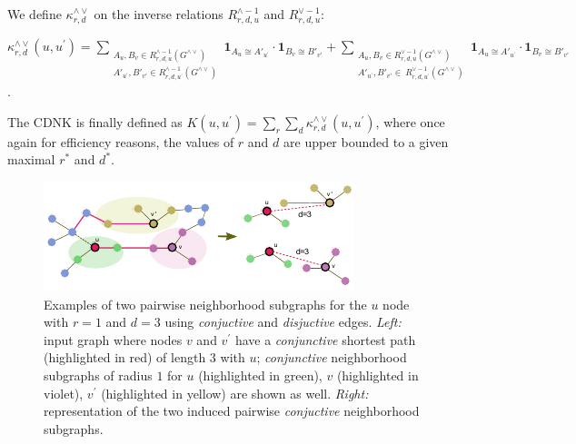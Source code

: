 \documentclass[review]{elsarticle}
\begin{document}
We define $\kappa^{\wedge\vee}_{r,d}$ on the  inverse relations ${R^{\wedge -1}_{r,d,u}}$ and ${R^{\vee -1}_{r,d,u}}$:
\begin{center}
 $\kappa^{\wedge\vee}_{r,d}(u,u^\prime) = \!\!\!\!\!\!\!\!\!\!\!\!
 \sum\limits_{\substack {A_u,{B}_{v} \in {R_{r,d,u}^{\wedge -1}}(G^{\wedge\vee}) \\ A'_{u^\prime},{B'}_{v'} \in {R_{r,d,u^\prime}^{\wedge -1}}(G^{\wedge\vee}) }} \!\!\!\!\!\!\!\!\!\!\!\!
  { \textbf{1}_{A_u \cong A'_{u^\prime}} \cdot { \textbf{1}_{B_{v} \cong B'_{v'}}}}
+ \!\!\!\!\!\!\!\!\!\!\!\!
 \sum\limits_{\substack {A_u,{B}_{v} \in {R_{r,d,u}^{\vee -1}}(G^{\wedge\vee}) \\
  A'_{u^\prime},{B'}_{v'} \in \ {R_{r,d,u^\prime}^{\vee -1}}(G^{\wedge\vee}) }} \!\!\!\!\!\!\!\!\!\!\!\!
  { \textbf{1}_{A_u \cong A'_{u^\prime}} \cdot { \textbf{1}_{B_{v} \cong B'_{v'}}}}
  $.
\end{center}
The CDNK is finally defined as $K(u,u^\prime) = \sum\limits_{r}{\sum\limits_{d}{\kappa^{\wedge\vee}_{r,d}(u,u^\prime)}}$, where once again for efficiency reasons, the values of $r$ and $d$ are upper bounded to a given maximal $r^*$ and $d^*$.

\begin{figure}
\centering
\includegraphics[width=.9\textwidth]{cdnk}
\caption{\label{fig:cdnk} Examples of two pairwise neighborhood subgraphs for the $u$ node with $r=1$ and $d=3$ using \textit{conjuctive} and \textit{disjuctive} edges. {\it Left:} input graph where nodes $v$ and $v^\prime$ have a {\it conjunctive} shortest path (highlighted in red) of length $3$ with $u$;  {\it conjunctive} neighborhood subgraphs of radius $1$ for $u$ (highlighted in green), $v$ (highlighted in violet), $v^\prime$ (highlighted in yellow)  are shown as well. {\it Right:} representation of the two induced pairwise \textit{conjuctive} neighborhood subgraphs.} 
\end{figure}
\end{document}
